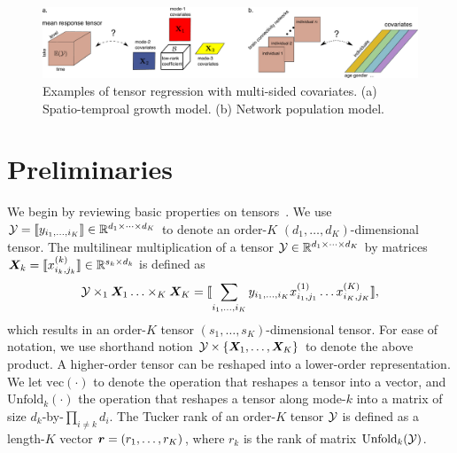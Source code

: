 \documentclass[twoside]{article}
\theoremstyle{plain}
\theoremstyle{definition}
\begin{document}
\begin{figure}
\begin{center}
\includegraphics[width=17cm]{demo.pdf}
  \end{center}
\caption{Examples of tensor regression with multi-sided covariates. (a) Spatio-temproal growth model. (b) Network population model.}
  \end{figure}





\section{Preliminaries}

We begin by reviewing basic properties on tensors~\cite{kolda2009tensor}. We use $\mathcal{Y}=\llbracket y_{i_1,\ldots,i_K} \rrbracket\in \mathbb{R}^{d_1\times \cdots\times d_K}$ to denote an order-$K$ $(d_1,\ldots,d_K)$-dimensional tensor. The multilinear multiplication of a tensor $\mathcal{Y}\in\mathbb{R}^{d_1\times \cdots\times d_K}$ by matrices $\bm X_k=\llbracket x_{i_k,j_k}^{(k)} \rrbracket\in\mathbb{R}^{s_k\times d_k}$ is defined as
\[
\mathcal{Y} \times_1\bm X_1\ldots \times_K \bm X_K=\llbracket \sum_{i_1,\ldots,i_K}y_{i_1,\ldots,i_K}x_{i_1,j_1}^{(1)}\ldots x_{i_K,j_K}^{(K)} \rrbracket,
\]
which results in an order-$K$ tensor $(s_1,\ldots,s_K)$-dimensional tensor. For ease of notation, we use shorthand notion $\mathcal{Y}\times\{\bm X_1,\ldots,\bm X_K\}$ to denote the above product. A higher-order tensor can be reshaped into a lower-order representation. We let $\text{vec}(\cdot)$ to denote the operation that reshapes a tensor into a vector, and $\text{Unfold}_k(\cdot)$ the operation that reshapes a tensor along mode-$k$ into a matrix of size $d_k$-by-$\prod_{i\neq k}d_i$. The Tucker rank of an order-$K$ tensor $\mathcal{Y}$ is defined as a length-$K$ vector $\bm{r}=(r_1,\ldots,r_K)$, where $r_k$ is the rank of matrix $\text{Unfold}_k(\mathcal{Y})$. 
\end{document}
